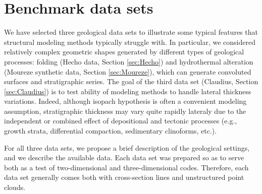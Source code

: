 \documentclass[final]{ring20}
\begin{document}

\section{Benchmark data sets}\label{sec:data}

We have selected three geological data sets to illustrate some typical features that structural modeling methods typically struggle with. In particular, we considered relatively complex geometric shapes generated by different types of geological processes: folding (Hecho data, Section \ref{sec:Hecho}) and hydrothermal alteration (Moureze synthetic data, Section \ref{sec:Moureze}), which can generate convoluted surfaces and stratigraphic series. The goal of the third data set (Claudius, Section \ref{sec:Claudius}) is to test ability of modeling methods to handle lateral thickness variations. Indeed, although isopach hypothesis is often a convenient modeling assumption, stratigraphic thickness may vary quite rapidly lateraly due to the independent or combined effect of depositional and tectonic processes (e.g., growth strata, differential compaction, sedimentary clinoforms, etc.). 

For all three data sets, we propose a brief description of the geological settings, and we describe the available data. Each data set was prepared so as to serve both as a test of two-dimensional and three-dimensional codes. Therefore, each data set generally comes both with cross-section lines and unstructured point clouds.
\end{document}
